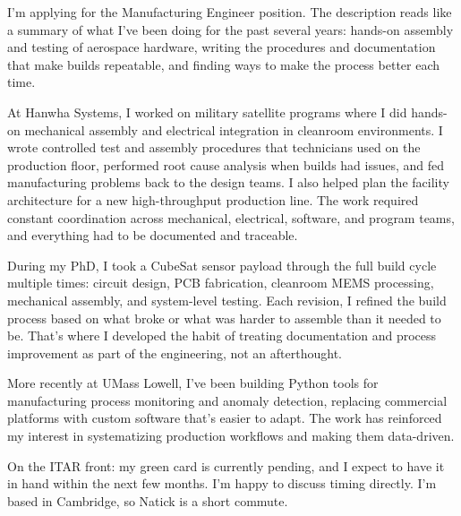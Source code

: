 \documentclass[letterpaper,11pt]{moderncv}
\date{\today}
\begin{document}
\makelettertitle

I'm applying for the Manufacturing Engineer position. The description reads like a summary of what I've been doing for the past several years: hands-on assembly and testing of aerospace hardware, writing the procedures and documentation that make builds repeatable, and finding ways to make the process better each time.

At Hanwha Systems, I worked on military satellite programs where I did hands-on mechanical assembly and electrical integration in cleanroom environments. I wrote controlled test and assembly procedures that technicians used on the production floor, performed root cause analysis when builds had issues, and fed manufacturing problems back to the design teams. I also helped plan the facility architecture for a new high-throughput production line. The work required constant coordination across mechanical, electrical, software, and program teams, and everything had to be documented and traceable.

During my PhD, I took a CubeSat sensor payload through the full build cycle multiple times: circuit design, PCB fabrication, cleanroom MEMS processing, mechanical assembly, and system-level testing. Each revision, I refined the build process based on what broke or what was harder to assemble than it needed to be. That's where I developed the habit of treating documentation and process improvement as part of the engineering, not an afterthought.

More recently at UMass Lowell, I've been building Python tools for manufacturing process monitoring and anomaly detection, replacing commercial platforms with custom software that's easier to adapt. The work has reinforced my interest in systematizing production workflows and making them data-driven.

On the ITAR front: my green card is currently pending, and I expect to have it in hand within the next few months. I'm happy to discuss timing directly. I'm based in Cambridge, so Natick is a short commute.

\makeletterclosing
\end{document}

